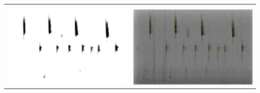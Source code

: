 \begin{center}
\begin{tabular}{cc}
\begin{minipage}{1.8truein}
\end{minipage}\\
\begin{minipage}{1.8truein}
\includegraphics[height=1truein]{images/Eroded_and_propagated}
\end{minipage}&
\begin{minipage}{1.8truein}
\includegraphics[height=1truein]{images/labeled}
\end{minipage}\\
\end{tabular}
\end{center}
